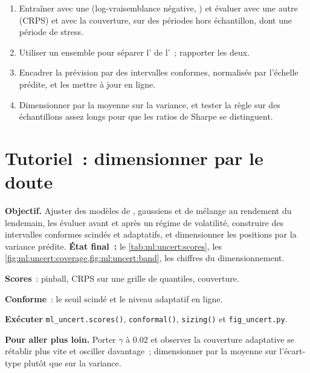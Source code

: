 \begin{method}\label{met:ml:uncert:method}
\begin{enumerate}
\item Entraîner avec une  (log-vraisemblance négative, ) et évaluer avec une autre (CRPS) et avec
la couverture, sur des périodes hors échantillon, dont une période de stress.
\item Utiliser un ensemble pour séparer l' de l'~; rapporter les deux.
\item Encadrer la prévision par des intervalles conformes, normalisés par l'échelle prédite, et les mettre à jour en ligne.
\item Dimensionner par la moyenne sur la variance, et tester la règle sur des échantillons assez longs pour que les ratios de Sharpe se distinguent.
\end{enumerate}
\end{method}

\section{Tutoriel~: dimensionner par le doute}\label{tut:ml:probabilistic-models-and-uncertainty:tut}

\begin{tutorial}
\textbf{Objectif.} Ajuster des modèles de , gaussiens et de mélange au rendement du lendemain, les évaluer avant et après un
régime de volatilité, construire des intervalles conformes scindés et adaptatifs, et dimensionner les positions par la variance prédite.
\textbf{État final~:} le \cref{tab:ml:uncert:scores}, les \cref{fig:ml:uncert:coverage,fig:ml:uncert:band}, les chiffres du dimensionnement.
\begin{tutsteps}
\item \textbf{Scores}~: pinball, CRPS sur une grille de quantiles, couverture.
\label{lst:ml:uncert:scores}
\item \textbf{Conforme}~: le seuil scindé et le niveau adaptatif en ligne.
\label{lst:ml:uncert:conformal}
\item \textbf{Exécuter} \texttt{ml\_uncert.scores()}, \texttt{conformal()}, \texttt{sizing()} et \texttt{fig\_uncert.py}.
\end{tutsteps}
\textbf{Pour aller plus loin.} Porter $\gamma$ à 0.02 et observer la couverture adaptative se rétablir plus vite et osciller davantage~; dimensionner par
la moyenne sur l'écart-type plutôt que sur la variance.
\end{tutorial}

